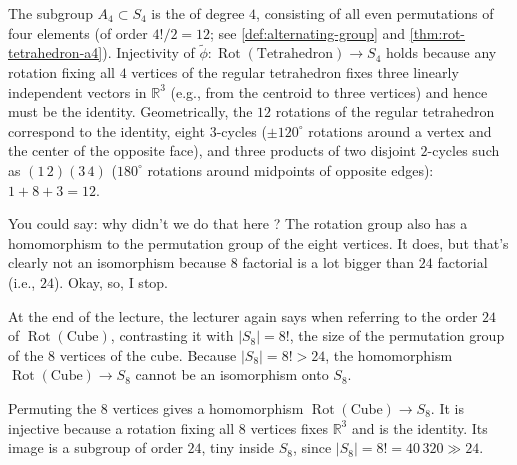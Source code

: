 \begin{aiNote}
The subgroup $A_4 \subset S_4$ is the  of degree $4$, consisting of all even permutations of four elements (of order $4! / 2 = 12$; see \cref{def:alternating-group} and \cref{thm:rot-tetrahedron-a4}). Injectivity of $\tilde{\phi} \colon \operatorname{Rot}(\text{Tetrahedron}) \to S_4$ holds because any rotation fixing all $4$ vertices of the regular tetrahedron fixes three linearly independent vectors in $\mathbb{R}^3$ (e.g., from the centroid to three vertices) and hence must be the identity. Geometrically, the $12$ rotations of the regular tetrahedron correspond to the identity, eight $3$-cycles ($\pm 120^\circ$ rotations around a vertex and the center of the opposite face), and three products of two disjoint $2$-cycles such as $(1\,2)(3\,4)$ ($180^\circ$ rotations around midpoints of opposite edges): $1 + 8 + 3 = 12$.
\end{aiNote}

\begin{speech}[00:43:31 - 00:43:54]
You could say: why didn't we do that here ? The rotation group also has a homomorphism to the permutation group of the eight vertices. It does, but that's clearly not an isomorphism because $8$ factorial is a lot bigger than $24$ factorial (i.e., $24$). Okay, so, I stop.
\end{speech}

\begin{aiNote}
At the end of the lecture, the lecturer again says  when referring to the order $24$ of $\operatorname{Rot}(\text{Cube})$, contrasting it with $|S_8| = 8!$, the size of the permutation group of the $8$ vertices of the cube. Because $|S_8| = 8! > 24$, the homomorphism $\operatorname{Rot}(\text{Cube}) \to S_8$ cannot be an isomorphism onto $S_8$.
\end{aiNote}

\begin{aiNote}
Permuting the $8$ vertices gives a homomorphism $\operatorname{Rot}(\text{Cube}) \to S_8$. It is injective because a rotation fixing all $8$ vertices fixes $\mathbb{R}^3$ and is the identity. Its image is a subgroup of order $24$, tiny inside $S_8$, since $|S_8| = 8! = 40\,320 \gg 24$.
\end{aiNote}

